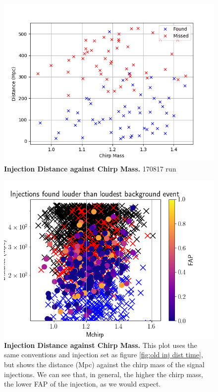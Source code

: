 \documentclass[11pt]{cuthesis}
\begin{document}
\begin{figure} %
\begin{center}
\includegraphics[width=0.8\linewidth]{mchirp_distance_inj.png}
\end{center}
\caption{\textbf{Injection Distance against Chirp Mass.} 170817 run} 
\label{fig:inj dist mchirp}
\end{figure}

\begin{figure} %
\begin{center}
\includegraphics[width=0.8\linewidth]{found_missed_injections_dist_mchirp.png}
\end{center}
\caption{\textbf{Injection Distance against Chirp Mass.} This plot uses the same conventions and injection set as figure \ref{fig:old inj dist time}, but shows the distance (Mpc) against the chirp mass of the signal injections. We can see that, in general, the higher the chirp mass, the lower FAP of the injection, as we would expect.}  
\label{fig:old inj dist mchirp}
\end{figure}
\end{document}
